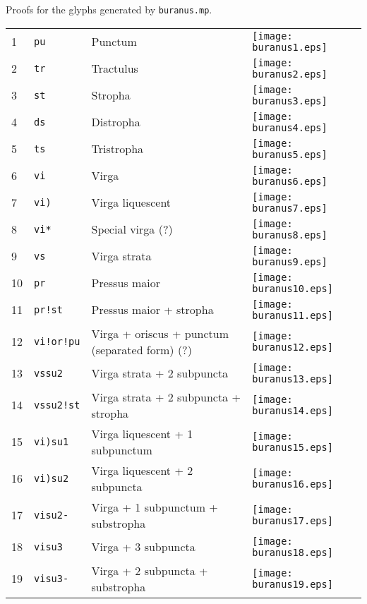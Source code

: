 \documentclass{scrarticle}
\begin{document}
Proofs for the glyphs generated by \texttt{buranus.mp}.

\vspace{1cm}

\begin{longtable}{l|l|l|l}
1 & \texttt{pu} & Punctum & \texttt{[image: buranus1.eps]} \\
2 & \texttt{tr} & Tractulus & \texttt{[image: buranus2.eps]} \\
3 & \texttt{st} & Stropha & \texttt{[image: buranus3.eps]} \\
4 & \texttt{ds} & Distropha & \texttt{[image: buranus4.eps]} \\
5 & \texttt{ts} & Tristropha & \texttt{[image: buranus5.eps]} \\
6 & \texttt{vi} & Virga & \texttt{[image: buranus6.eps]} \\
7 & \texttt{vi)} & Virga liquescent & \texttt{[image: buranus7.eps]} \\
8 & \texttt{vi*} & Special virga (?) & \texttt{[image: buranus8.eps]} \\
9 & \texttt{vs} & Virga strata & \texttt{[image: buranus9.eps]} \\
10 & \texttt{pr} & Pressus maior & \texttt{[image: buranus10.eps]} \\
11 & \texttt{pr!st} & Pressus maior + stropha & \texttt{[image: buranus11.eps]} \\
12 & \texttt{vi!or!pu} & Virga + oriscus + punctum (separated form) (?) & \texttt{[image: buranus12.eps]} \\
13 & \texttt{vssu2} & Virga strata + 2 subpuncta & \texttt{[image: buranus13.eps]} \\
14 & \texttt{vssu2!st} & Virga strata + 2 subpuncta + stropha & \texttt{[image: buranus14.eps]} \\
15 & \texttt{vi)su1} & Virga liquescent + 1 subpunctum & \texttt{[image: buranus15.eps]} \\
16 & \texttt{vi)su2} & Virga liquescent + 2 subpuncta & \texttt{[image: buranus16.eps]} \\
17 & \texttt{visu2-} & Virga + 1 subpunctum + substropha & \texttt{[image: buranus17.eps]} \\
18 & \texttt{visu3} & Virga + 3 subpuncta & \texttt{[image: buranus18.eps]} \\
19 & \texttt{visu3-} & Virga + 2 subpuncta + substropha & \texttt{[image: buranus19.eps]} \\

\end{longtable}
\end{document}
